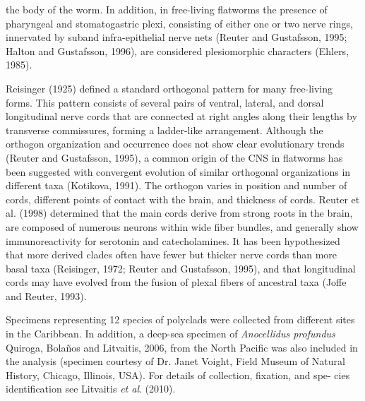\begin{multicols}{2}
the body of the worm. In addition, in free-living flatworms
the presence of pharyngeal and stomatogastric plexi, consisting of either one or two nerve rings, innervated by suband infra-epithelial nerve nets (Reuter and Gustafsson,
1995; Halton and Gustafsson, 1996), are considered plesiomorphic characters (Ehlers, 1985).
\par{}Reisinger (1925) defined a standard orthogonal pattern for many free-living forms. This pattern consists of
several pairs of ventral, lateral, and dorsal longitudinal
nerve cords that are connected at right angles along their
lengths by transverse commissures, forming a ladder-like
arrangement. Although the orthogon organization and occurrence does not show clear evolutionary trends (Reuter
and Gustafsson, 1995), a common origin of the CNS in
flatworms has been suggested with convergent evolution of
similar orthogonal organizations in different taxa (Kotikova, 1991). The orthogon varies in position and number of
cords, different points of contact with the brain, and thickness of cords. Reuter et al. (1998) determined that the main
cords derive from strong roots in the brain, are composed of
numerous neurons within wide fiber bundles, and generally
show immunoreactivity for serotonin and catecholamines.
It has been hypothesized that more derived clades often
have fewer but thicker nerve cords than more basal taxa
(Reisinger, 1972; Reuter and Gustafsson, 1995), and that
longitudinal cords may have evolved from the fusion of
plexal fibers of ancestral taxa (Joffe and Reuter, 1993).

\lipsum



\par{}Specimens representing 12 species of polyclads were
collected from different sites in the Caribbean. In addition,
a deep-sea specimen of \textit{Anocellidus profundus} Quiroga,
Bolaños and Litvaitis, 2006, from the North Pacific was
also included in the analysis (specimen courtesy of Dr.
Janet Voight, Field Museum of Natural History, Chicago,
Illinois, USA). For details of collection, fixation, and spe-
cies identification see Litvaitis \textit{et al}. (2010).



\end{multicols}
